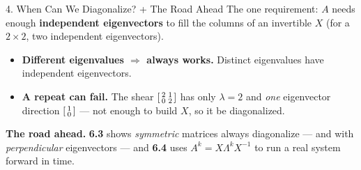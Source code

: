 \documentclass[10pt]{article}
\begin{document}
\begin{notesbox}{4. When Can We Diagonalize? + The Road Ahead}
The one requirement: $A$ needs enough \textbf{independent eigenvectors} to fill the columns of an
invertible $X$ (for a $2\times2$, two independent eigenvectors).
\begin{itemize}\setlength{\itemsep}{2pt}
  \item \textbf{Different eigenvalues $\Rightarrow$ always works.} Distinct eigenvalues have independent eigenvectors.
  \item \textbf{A repeat can fail.} The shear $\begin{bsmallmatrix}2&1\\0&2\end{bsmallmatrix}$ has only $\lambda=2$
        and \emph{one} eigenvector direction $\begin{bsmallmatrix}1\\0\end{bsmallmatrix}$ --- not enough to build $X$, so it  be diagonalized.
\end{itemize}

\vspace{3pt}
\textbf{The road ahead.} \textbf{6.3} shows \emph{symmetric} matrices always diagonalize --- and with
\emph{perpendicular} eigenvectors --- and \textbf{6.4} uses $A^k=X\Lambda^k X^{-1}$ to run a real system
forward in time.
\end{notesbox}
\end{document}
